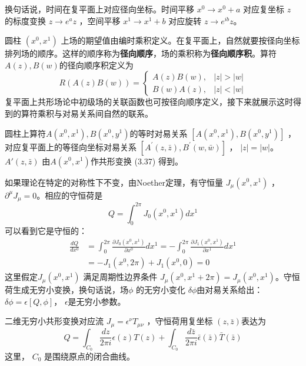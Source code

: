 换句话说，时间在复平面上对应径向坐标。时间平移 $x^0\to x^0+a$ 对应复坐标 $z$ 的标度变换 $z\to e^a z$ ，空间平移 $x^1\to x^1+b$ 对应旋转 $z\to e^{ib}z $。

圆柱 $(x^0,x^1)$ 上场的期望值由编时乘积定义。在复平面上，自然就要按径向坐标排列场的顺序。这样的顺序称为\textbf{径向顺序}，场的乘积称为\textbf{径向顺序积}。算符 $A(z),B(w) $的径向顺序积定义为
\begin{equation}
	R(A(z) B(w))=\left\{\begin{array}{ll} A(z) B(w), & |z|>|w| \\ B(w) A(z), & |z|<|w| \end{array}\right.
\end{equation}
复平面上共形场论中初级场的关联函数也可按径向顺序定义，接下来就展示这时得到的算符乘积与对易关系间自然的联系。

圆柱上算符$ A(x^0,x^1),B(x^0,y^1) $的等时对易关系 $[A(x^0,x^1),B(x^0,y^1)]$ ，对应复平面上的等径向坐标对易关系 $\left[A^{\prime}(z, \bar{z}), B^{\prime}(w, \bar{w})\right]$ ， $|z|=|w| $。 $A'(z,\bar{z})$ 由$ A(x^0,x^1) $作共形变换 (3.37) 得到。

如果理论在特定的对称性下不变，由Noether定理，有守恒量 $J_\mu(x^0,x^1)$ ，$ \partial^\mu J_\mu=0 $。相应的守恒荷是
\begin{equation}
	Q=\int_{0}^{2 \pi} J_{0}\left(x^{0}, x^{1}\right) d x^{1}
\end{equation}
可以看到它是守恒的：
\begin{equation}
	\begin{aligned} \frac{d Q}{d x^{0}} &=\int_{0}^{2 \pi} \frac{\partial J_{0}\left(x^{0}, x^{1}\right)}{\partial x^{0}} d x^{1}=-\int_{0}^{2 \pi} \frac{\partial J_{1}\left(x^{0}, x^{1}\right)}{\partial x^{1}} d x^{1} \\ &=-J_{1}\left(x^{0}, 2 \pi\right)+J_{1}\left(x^{0}, 0\right)=0 \end{aligned}
\end{equation}
这里假定$ J_\mu(x^0,x^1)$ 满足周期性边界条件 $J_\mu(x^0,x^1+2\pi)=J_\mu(x^0,x^1) $。守恒荷生成无穷小变换，换句话说，场$ \phi$ 的无穷小变化 $\delta \phi $由对易关系给出： $\delta \phi=\epsilon[Q,\phi] $， $\epsilon $是无穷小参数。

二维无穷小共形变换对应流 $J_\mu=\epsilon^\nu T_{\mu\nu}$ ，守恒荷用复坐标 $(z,\bar{z}) $表达为
\begin{equation}
	Q=\int_{C_{0}} \frac{d z}{2 \pi i} \epsilon(z) T(z)+\int_{C_{0}} \frac{d \bar{z}}{2 \pi i} \bar{\epsilon}(\bar{z}) \bar{T}(\bar{z})
\end{equation}
这里， $C_0$ 是围绕原点的闭合曲线。

